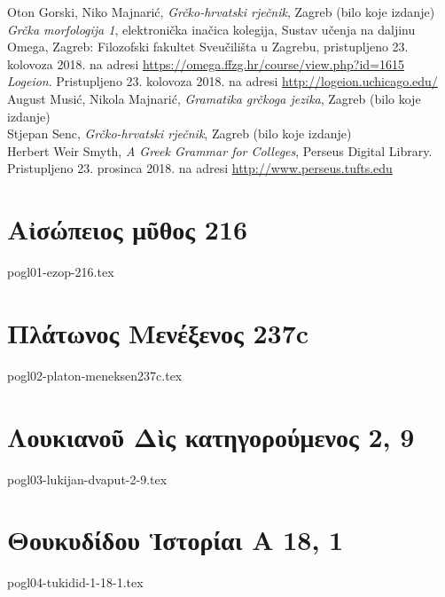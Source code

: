 \documentclass[a4paper,12pt,twoside]{report}
\begin{document}
Oton Gorski, Niko Majnarić, \textit{Grčko-hrvatski rječnik}, Zagreb (bilo koje izdanje)\\
\textit{Grčka morfologija 1}, elektronička inačica kolegija, Sustav učenja na daljinu Omega, Zagreb: Filozofski fakultet Sveučilišta u Zagrebu, pristupljeno 23. kolovoza 2018. na adresi \url{https://omega.ffzg.hr/course/view.php?id=1615}\\
\textit{Logeion}. Pristupljeno 23. kolovoza 2018. na adresi \url{http://logeion.uchicago.edu/}\\
August Musić, Nikola Majnarić, \textit{Gramatika grčkoga jezika}, Zagreb (bilo koje izdanje)\\
Stjepan Senc, \textit{Grčko-hrvatski rječnik}, Zagreb (bilo koje izdanje)\\
Herbert Weir Smyth, \textit{A Greek Grammar for Colleges}, Perseus Digital Library. Pristupljeno 23. prosinca 2018. na adresi \url{http://www.perseus.tufts.edu}\\


\newpage

\chapter[Αἰσώπειος μῦθος 216]{\textgreek[variant=ancient]{Αἰσώπειος μῦθος} 216}

{pogl01-ezop-216.tex}

\chapter[Πλάτωνος Μενέξενος]{\textgreek[variant=ancient]{Πλάτωνος Μενέξενος} 237c}

{pogl02-platon-meneksen237c.tex}

\chapter[Λουκιανοῦ Δὶς κατηγορούμενος ]{\textgreek[variant=ancient]{Λουκιανοῦ Δὶς κατηγορούμενος } 2, 9}

{pogl03-lukijan-dvaput-2-9.tex}


\chapter[Θουκυδίδου Ἱστορίαι Α]{\textgreek[variant=ancient]{Θουκυδίδου Ἱστορίαι Α} 18, 1}

{pogl04-tukidid-1-18-1.tex}
\end{document}
